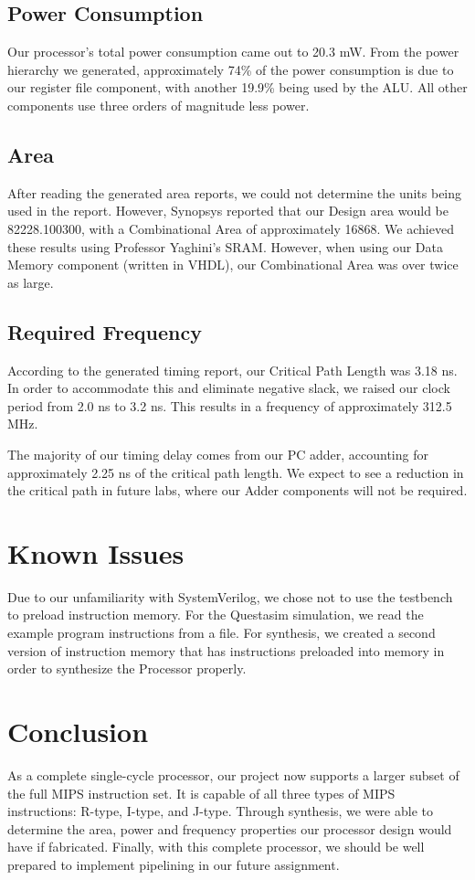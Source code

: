 \documentclass{article}
\begin{document}
\subsection{Power Consumption}
Our processor's total power consumption came out to 20.3 mW. From the power hierarchy we generated, approximately 74\% of the power consumption is due to our register file component, with another 19.9\% being used by the ALU. All other components use three orders of magnitude less power.

\subsection{Area}
After reading the generated area reports, we could not determine the units being used in the report. However, Synopsys reported that our Design area would be 82228.100300, with a Combinational Area of approximately 16868. We achieved these results using Professor Yaghini's SRAM. However, when using our Data Memory component (written in VHDL), our Combinational Area was over twice as large.

\subsection{Required Frequency}
According to the generated timing report, our Critical Path Length was 3.18 ns. In order to accommodate this and eliminate negative slack, we raised our clock period from 2.0 ns to 3.2 ns. This results in a frequency of approximately 312.5 MHz.

The majority of our timing delay comes from our PC adder, accounting for approximately 2.25 ns of the critical path length. We expect to see a reduction in the critical path in future labs, where our Adder components will not be required.

\section{Known Issues} 
Due to our unfamiliarity with SystemVerilog, we chose not to use the testbench to preload instruction memory. For the Questasim simulation, we read the example program instructions from a file.  For synthesis, we created a second version of instruction memory that has instructions preloaded into memory in order to synthesize the Processor properly.
\\
\section{Conclusion}

As a complete single-cycle processor, our project now supports a larger subset of the full MIPS instruction set. It is capable of all three types of MIPS instructions: R-type, I-type, and J-type. Through synthesis, we were able to determine the area, power and frequency properties our processor design would have if fabricated. Finally, with this complete processor, we should be well prepared to implement pipelining in our future assignment.
\end{document}
